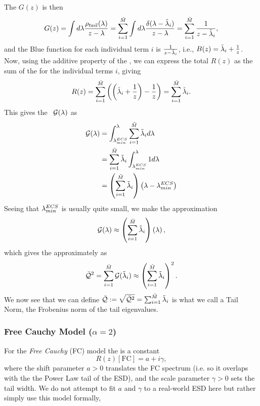 The \GreensFunction $G(z)$ is then
\begin{equation}
\label{eqn:spikes_model_1}
G(z) = \int d\lambda \dfrac{ \rho_{tail}(\lambda) }{z - \lambda} =
\sum_{i=1}^{\tilde{M}} \int d\lambda \dfrac{\delta(\lambda-\tilde{\lambda}_{i}) }{z - \lambda} =
\sum_{i=1}^{\tilde{M}} \dfrac{1}{z-\tilde{\lambda}_{i}}  ,
\end{equation}
and the Blue function for each individual term $i$ is $\frac{1}{z-\tilde{\lambda}_{i}}$, i.e., $B(z)=\tilde{\lambda}_{i}+\frac{1}{z}$. 
Now, using the additive property of the \RTransform, we can express the total $R(z)$ as the sum of the \RTransforms for the individual terms $i$, giving
\begin{equation}
\label{eqn:spikes_model_2}
R(z) =\sum_{i=1}^{\tilde{M}}\left(\left(\tilde{\lambda}_{i}+ \dfrac{1}{z}\right) - \dfrac{1}{z}\right)=\sum_{i=1}^{\tilde{M}}\tilde{\lambda}_{i}  .
\end{equation}
This gives the \GEN~$\mathcal{G(\lambda)}$ as
\begin{align}
\label{eqn:spikes_model_3} 
\mathcal{G(\lambda)} 
&= \int_{\lambda^{ECS}_{min}}^{\lambda}\sum_{i=1}^{\tilde{M}}\tilde{\lambda}_{i} d\lambda \\ \nonumber
&= \sum_{i=1}^{\tilde{M}}\tilde{\lambda}_{i} \int_{\lambda^{ECS}_{min}}^{\lambda} 1 d\lambda \\ \nonumber
&= \left(\sum_{i=1}^{\tilde{M}}\tilde{\lambda}_{i}\right)\left(\lambda-\lambda^{ECS}_{min}\right)
\end{align}
Seeing that $\lambda^{ECS}_{min}$ is usually quite small, we make the approximation
\begin{align}
\mathcal{G(\lambda)}  \approx \left(\sum_{i=1}^{\tilde{M}}\tilde{\lambda}_{i}\right)\left(\lambda\right)  ,
\end{align}
which gives the \QualitySquared approximately as
\begin{align}
  \label{eqn:spikes_model_4}
  \bar{\mathcal{Q}}^{2} = \sum_{i=1}^{\tilde{M}}\mathcal{G}(\tilde{\lambda}_{i}) 
 \approx\left(\sum_{i=1}^{\tilde{M}}\tilde{\lambda}_{i}\right)^{2}  .
\end{align}
We now see that we can define $\bar{\mathcal{Q}}:=\sqrt{\bar{\mathcal{Q}}^{2}}=\sum_{i=1}^{\tilde{M}}\tilde{\lambda}_{i}$ is what we call a Tail Norm,
the Frobenius norm of the tail eigenvalues.

\subsubsection{Free Cauchy Model (\texorpdfstring{$\alpha = 2$}{alpha = 2})}
\label{sxn:r_transforms:free_cauchy}

For the \emph{Free Cauchy} (FC) model the \RTransform is a constant
\begin{equation}
\label{eqn:free_cauchy_R}
R(z)[\mathrm{FC}] = a + i\gamma ,
\end{equation}
where the shift parameter $a>0$ translates the FC spectrum (i.e. so it overlaps with the the Power Law tail of the ESD),
and the scale parameter $\gamma>0$ sets the tail width.
We do not attempt to fit $a$ and $\gamma$ to a real-world ESD here but rather simply use this model formally,

